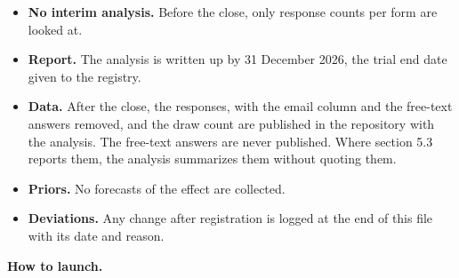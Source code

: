 \begin{itemize}
\item
  \textbf{No interim analysis.} Before the close, only response counts per form are looked at.
\item
  \textbf{Report.} The analysis is written up by 31 December 2026, the trial end date given to the
  registry.
\item
  \textbf{Data.} After the close, the responses, with the email column and the free-text answers
  removed, and the draw count are published in the repository with the analysis. The free-text
  answers are never published. Where section 5.3 reports them, the analysis summarizes them
  without quoting them.
\item
  \textbf{Priors.} No forecasts of the effect are collected.
\item
  \textbf{Deviations.} Any change after registration is logged at the end of this file with its date
  and reason.
\end{itemize}

\textbf{How to launch.}

